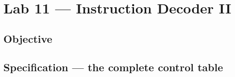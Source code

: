 
\chapter{Lab 11 --- Instruction Decoder II}

\section{Objective}

\section{Specification --- the complete control table}


